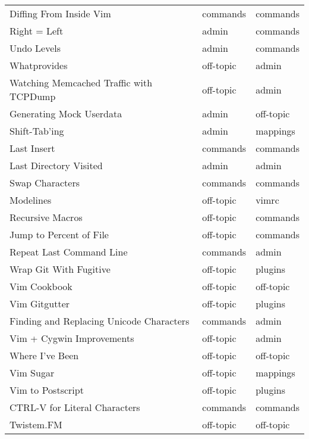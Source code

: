 \begin{tabular}{lll}
 Diffing From Inside Vim                   & commands    & commands  \\
 Right = Left                              & admin       & commands  \\
 Undo Levels                               & admin       & commands  \\
 Whatprovides                              & off-topic   & admin     \\
 Watching Memcached Traffic with TCPDump   & off-topic   & admin     \\
 Generating Mock Userdata                  & admin       & off-topic \\
 Shift-Tab'ing                             & admin       & mappings  \\
 Last Insert                               & commands    & commands  \\
 Last Directory Visited                    & admin       & admin     \\
 Swap Characters                           & commands    & commands  \\
 Modelines                                 & off-topic   & vimrc     \\
 Recursive Macros                          & off-topic   & commands  \\
 Jump to Percent of File                   & off-topic   & commands  \\
 Repeat Last Command Line                  & commands    & admin     \\
 Wrap Git With Fugitive                    & off-topic   & plugins   \\
 Vim Cookbook                              & off-topic   & off-topic \\
 Vim Gitgutter                             & off-topic   & plugins   \\
 Finding and Replacing Unicode Characters  & commands    & admin     \\
 Vim + Cygwin Improvements                 & off-topic   & admin     \\
 Where I've Been                           & off-topic   & off-topic \\
 Vim Sugar                                 & off-topic   & mappings  \\
 Vim to Postscript                         & off-topic   & plugins   \\
 CTRL-V for Literal Characters             & commands    & commands  \\
 Twistem.FM                                & off-topic   & off-topic \\

\end{tabular}
